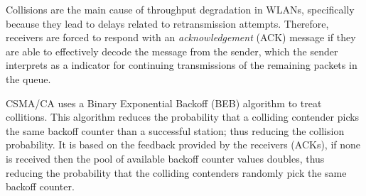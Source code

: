 Collisions are the main cause of throughput degradation in WLANs, specifically because they lead to delays related to retransmission attempts. Therefore, receivers are forced to respond with an \emph{acknowledgement} (ACK) message if they are able to effectively decode the message from the sender, which the sender interprets as a indicator for continuing transmissions of the remaining packets in the queue. 


CSMA/CA uses a Binary Exponential Backoff (BEB) algorithm to treat collitions. This algorithm reduces the probability that a colliding contender picks the same backoff counter than a successful station; thus reducing the collision probability. It is based on the feedback provided by the receivers (ACKs), if none is received then the pool of available backoff counter values doubles, thus reducing the probability that the colliding contenders randomly pick the same backoff counter. 